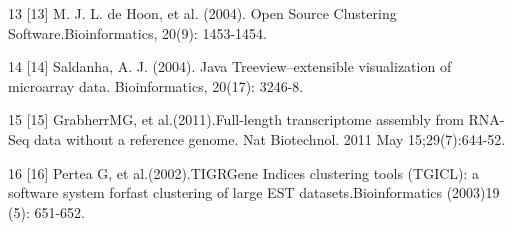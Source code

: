 \documentclass[10pt,oneside,a4paper]{article}	%
\begin{document}
\begin{tablenotes}
\item[13] {[13] M. J. L. de Hoon, et al. (2004). Open Source Clustering Software.Bioinformatics, 20(9): 1453-1454.}
\item[14] {[14] Saldanha, A. J. (2004). Java Treeview--extensible visualization of microarray data. Bioinformatics, 20(17): 3246-8.}
\item[15] {[15] GrabherrMG, et al.(2011).Full-length transcriptome assembly from RNA-Seq data without a reference genome. Nat Biotechnol. 2011 May 15;29(7):644-52.}
\item[16] {[16] Pertea G, et al.(2002).TIGRGene Indices clustering tools (TGICL): a software system forfast clustering of large EST datasets.Bioinformatics (2003)19 (5): 651-652.}
\end{tablenotes}
%
\end{document}
